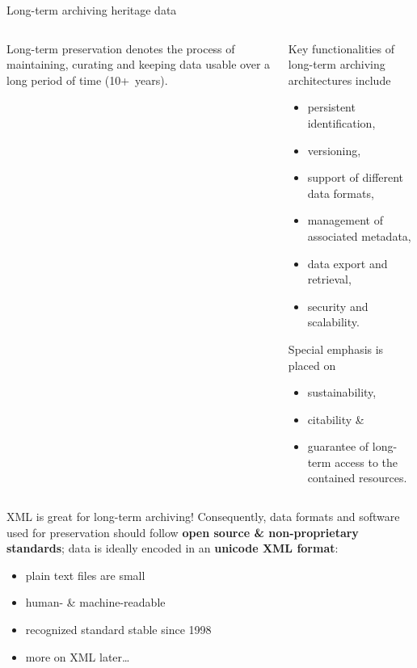 \begin{frame}[allowframebreaks]{Long-term archiving heritage data}
    \begin{columns}
    \begin{block}{Long-term preservation} denotes the process of maintaining, curating and keeping data usable over a long period of time (10+~years).
    \end{block}
    \begin{block}{Key functionalities of long-term archiving architectures include}
    \begin{itemize}\footnotesize
        \item persistent identification, 
        \item versioning, 
        \item support of different data formats, 
        \item management of associated metadata, 
        \item data export and retrieval, 
        \item security and scalability. 
    \end{itemize}
    
    Special emphasis is placed on 
    \begin{itemize}\footnotesize
        \item sustainability,
        \item citability \& 
        \item guarantee of long-term access to the contained resources. 
    \end{itemize}
    \end{block}
    \end{columns}
    
    \begin{block}{XML is great for long-term archiving!}
        Consequently, data formats and software used for preservation should follow \textbf{open source \& non-proprietary standards}; data is ideally encoded in an \textbf{unicode XML format}:
        \begin{itemize}
            \item plain text files are small
            \item human- \& machine-readable
            \item recognized standard stable since 1998
            \item more on XML later\dots
        \end{itemize}
    \end{block}
    
 \end{frame}



